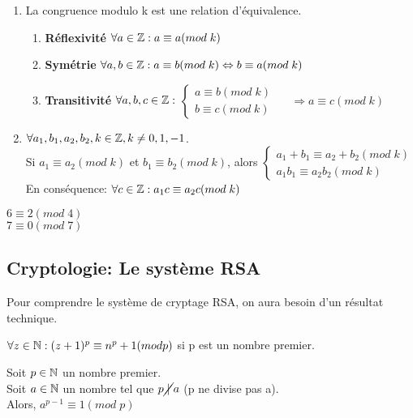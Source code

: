 \begin{enumerate}
\item La congruence modulo k est une relation d'équivalence.
	\begin{enumerate}[-]
	\item \textbf{Réflexivité} $\forall a \in \mathbb{Z}: a \equiv a(mod\;k)$
	\item \textbf{Symétrie} $\forall a,b \in \mathbb{Z}: a \equiv b(mod\;k) \Leftrightarrow b \equiv a(mod\;k)$
	\item \textbf{Transitivité} $\forall a,b,c \in \mathbb{Z}:$
				$ \left\{\begin{matrix}
				a \equiv b(mod\;k)\\ 
				b \equiv c(mod\;k)
				\end{matrix}\right.$ $\quad \Rightarrow a\equiv c(mod\;k)$
	\end{enumerate}

\item $\forall a_1,b_1,a_2,b_2,k \in \mathbb{Z}, k\neq 0,1,-1$. \\
Si $a_1 \equiv a_2 (mod\;k)$ et $b_1 \equiv b_2 (mod\;k)$, alors $\left\{\begin{matrix}
					a_1 + b_1 \equiv a_2 + b_2 (mod\;k)\\ 
					a_1 b_1 \equiv a_2 b_2 (mod\;k)
					\end{matrix}\right.$\\
En conséquence: $\forall c\in \mathbb{Z}: a_1 c \equiv a_2 c(mod\;k)$
\end{enumerate}

\begin{exmp}
$6 \equiv 2(mod\;4)$\\
$7 \equiv 0(mod\;7)$
\end{exmp}

\subsection{Cryptologie: Le système RSA}

Pour comprendre le système de cryptage RSA, on aura besoin d'un résultat technique.

\begin{lemme}
$\forall z \in \mathbb{N}: (z+1)^p \equiv n^p + 1(mod p)$ si p est un nombre premier.
\end{lemme}

\begin{thrm}
Soit $p\in \mathbb{N}$ un nombre premier.\\
Soit $a\in \mathbb{N}$ un nombre tel que $p\cancel{\;|\;}a$ (p ne divise pas a).\\
Alors, $a^{p-1} \equiv 1(mod\;p)$\\
\end{thrm}

